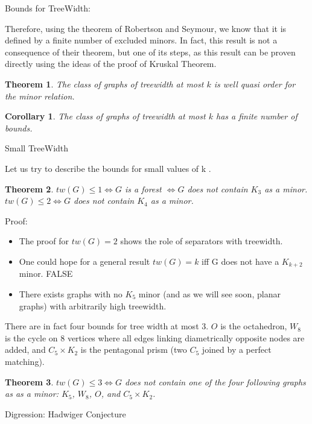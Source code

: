\documentclass[12pt,a4paper]{article}
\newtheorem{theorem}{Theorem}
\newtheorem{corollary}{Corollary}
\begin{document}
Bounds for TreeWidth:

Therefore, using the theorem of Robertson and Seymour, we know that it is
defined by a finite number of excluded minors. In fact, this result is not a
consequence of their theorem, but one of its steps, as this result can be proven
directly using the ideas of the proof of Kruskal Theorem.

\begin{theorem}
  The class of graphs of treewidth at most $k$ is well quasi order for the minor
  relation.
\end{theorem}

\begin{corollary}
The class of graphs of treewidth at most $k$ has a finite number of bounds.
\end{corollary}

Small TreeWidth

Let us try to describe the bounds for small values of k .

\begin{theorem}
  $tw( G ) \leq 1 \Leftrightarrow G$ is a forest $\Leftrightarrow G$ does not
  contain $K_3$ as a minor.\\
  $tw( G ) \leq 2 \Leftrightarrow G$ does not contain $K_4$ as a minor.
\end{theorem}

Proof:
\begin{itemize}
\item The proof for $tw( G ) = 2$ shows the role of separators with treewidth.
\item One could hope for a general result $tw( G ) = k$ iff G does not have a
  $K_{k + 2}$ minor. FALSE
\item There exists graphs with no $K_5$ minor (and as we will see soon, planar
  graphs) with arbitrarily high treewidth.
\end{itemize}

There are in fact four bounds for tree width at most 3. $O$ is the octahedron,
$W_8$ is the cycle on 8 vertices where all edges linking diametrically opposite
nodes are added, and $C_5 \times K_2$ is the pentagonal prism (two $C_5$ joined
by a perfect matching).

\begin{theorem}
  $tw( G ) \leq 3 \Leftrightarrow G$ does not contain one of the four following
  graphs as as a minor: $K_5$, $W_8$, $O$, and $C_5 \times K_2$.
\end{theorem}

Digression: Hadwiger Conjecture
\end{document}
